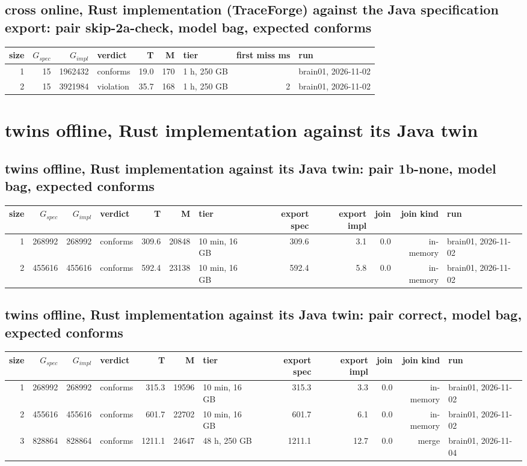 \documentclass[10pt]{article}
\begin{document}
\subsection*{cross online, Rust implementation (TraceForge) against the Java specification export: pair \textsf{skip-2a-check}, model bag, expected conforms}
\begin{longtable}{@{}rrrlrrlrl@{}}
\toprule
size & $G_{\mathit{spec}}$ & $G_{\mathit{impl}}$ & verdict & T & M & tier & first miss ms & run \\
\midrule
\endhead
\color{red} 1 & 15 & 1962432 & conforms & 19.0 & 170 & 1 h, 250 GB &  & brain01, 2026-11-02 \\
\color{red} 2 & 15 & 3921984 & violation & 35.7 & 168 & 1 h, 250 GB & 2 & brain01, 2026-11-02 \\
\bottomrule
\end{longtable}
\section*{twins offline, Rust implementation against its Java twin}
\subsection*{twins offline, Rust implementation against its Java twin: pair \textsf{1b-none}, model bag, expected conforms}
\begin{longtable}{@{}rrrlrrlrrrrl@{}}
\toprule
size & $G_{\mathit{spec}}$ & $G_{\mathit{impl}}$ & verdict & T & M & tier & export spec & export impl & join & join kind & run \\
\midrule
\endhead
\color{red} 1 & 268992 & 268992 & conforms & 309.6 & 20848 & 10 min, 16 GB & 309.6 & 3.1 & 0.0 & in-memory & brain01, 2026-11-02 \\
\color{red} 2 & 455616 & 455616 & conforms & 592.4 & 23138 & 10 min, 16 GB & 592.4 & 5.8 & 0.0 & in-memory & brain01, 2026-11-02 \\
\bottomrule
\end{longtable}
\subsection*{twins offline, Rust implementation against its Java twin: pair \textsf{correct}, model bag, expected conforms}
\begin{longtable}{@{}rrrlrrlrrrrl@{}}
\toprule
size & $G_{\mathit{spec}}$ & $G_{\mathit{impl}}$ & verdict & T & M & tier & export spec & export impl & join & join kind & run \\
\midrule
\endhead
\color{red} 1 & 268992 & 268992 & conforms & 315.3 & 19596 & 10 min, 16 GB & 315.3 & 3.3 & 0.0 & in-memory & brain01, 2026-11-02 \\
\color{red} 2 & 455616 & 455616 & conforms & 601.7 & 22702 & 10 min, 16 GB & 601.7 & 6.1 & 0.0 & in-memory & brain01, 2026-11-02 \\
\color{blue} 3 & 828864 & 828864 & conforms & 1211.1 & 24647 & 48 h, 250 GB & 1211.1 & 12.7 & 0.0 & merge & brain01, 2026-11-04 \\
\bottomrule
\end{longtable}
\end{document}
